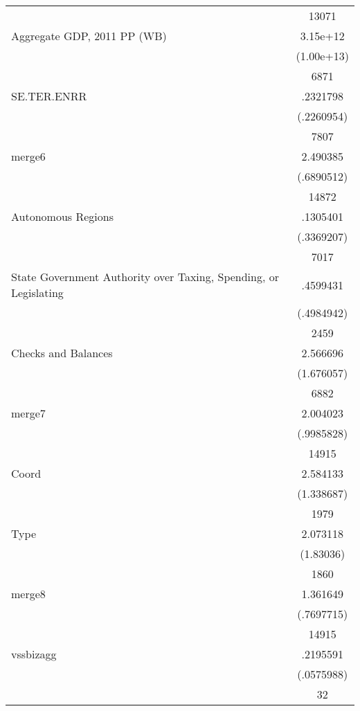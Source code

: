 {\begin{tabular}{l*{1}{c}}
                    &       13071\\
Aggregate GDP, 2011 PP (WB)&    3.15e+12\\
                    &  (1.00e+13)\\
                    &        6871\\
SE.TER.ENRR         &    .2321798\\
                    &  (.2260954)\\
                    &        7807\\
merge6              &    2.490385\\
                    &  (.6890512)\\
                    &       14872\\
Autonomous Regions  &    .1305401\\
                    &  (.3369207)\\
                    &        7017\\
State Government Authority over Taxing, Spending, or Legislating&    .4599431\\
                    &  (.4984942)\\
                    &        2459\\
Checks and Balances &    2.566696\\
                    &  (1.676057)\\
                    &        6882\\
merge7              &    2.004023\\
                    &  (.9985828)\\
                    &       14915\\
Coord               &    2.584133\\
                    &  (1.338687)\\
                    &        1979\\
Type                &    2.073118\\
                    &   (1.83036)\\
                    &        1860\\
merge8              &    1.361649\\
                    &  (.7697715)\\
                    &       14915\\
vssbizagg           &    .2195591\\
                    &  (.0575988)\\
                    &          32\\

\end{tabular}}
